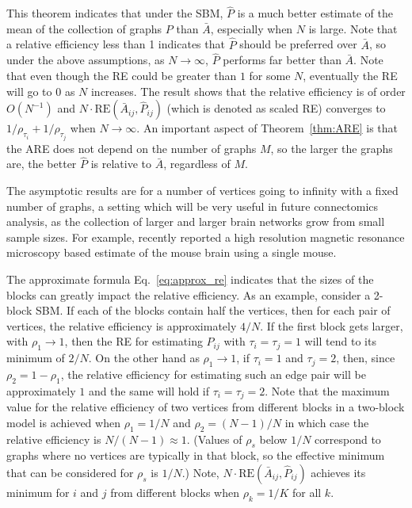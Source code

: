 \documentclass[journal,twoside,web]{ieeecolor}
\begin{document}
This theorem indicates that under the SBM, $\hat{P}$ is a much better estimate of the mean of the collection of graphs $P$ than $\bar{A}$, especially when $N$ is large.
Note that a relative efficiency less than 1 indicates that $\hat{P}$ should be preferred over $\bar{A}$, so under the above assumptions, as $N\to\infty$, $\hat{P}$ performs far better than $\bar{A}$.
Note that even though the RE could be greater than $1$ for some $N$, eventually the RE will go to 0 as $N$ increases.
The result shows that the relative efficiency is of order $O(N^{-1})$ and $N \cdot \mathrm{RE}(\bar{A}_{ij}, \hat{P}_{ij})$ (which is denoted as scaled RE) converges to $1/\rho_{\tau_i}+1/\rho_{\tau_j}$ when $N\to\infty$.
An important aspect of Theorem~\ref{thm:ARE} is that the ARE does not depend on the number of graphs $M$, so the larger the graphs are, the better $\hat{P}$ is relative to $\bar{A}$, regardless of $M$.

The asymptotic results are for a number of vertices going to infinity with a fixed number of graphs, a setting which will be very useful in future connectomics analysis, as the collection of larger and larger brain networks grow from small sample sizes.
For example, \cite{Calabrese2015} recently reported a high resolution magnetic resonance microscopy based estimate of the mouse brain using a single mouse.

The approximate formula Eq.~\ref{eq:approx_re} indicates that the sizes of the blocks can greatly impact the relative efficiency.
As an example, consider a 2-block SBM.
If each of the blocks contain half the vertices, then for each pair of vertices, the relative efficiency is approximately $4/N$.
If the first block gets larger, with $\rho_1\to 1$, then the RE for estimating $P_{ij}$ with $\tau_i=\tau_j=1$ will tend to its minimum of $2/N$.
On the other hand as $\rho_1\to 1$, if $\tau_i=1$ and $\tau_j=2$, then, since $\rho_2=1-\rho_1$, the relative efficiency for estimating such an edge pair will be approximately $1$ and the same will hold if $\tau_i=\tau_j=2$.
Note that the maximum value for the relative efficiency of two vertices from different blocks in a two-block model is achieved when $\rho_1=1/N$ and $\rho_2=(N-1)/N$ in which case the relative efficiency is $N/(N-1) \approx 1$.
(Values of $\rho_s$ below $1/N$ correspond to graphs where no vertices are typically in that block, so the effective minimum that can be considered for $\rho_s$ is $1/N$.)
Note, $N \cdot \mathrm{RE}(\bar{A}_{ij}, \hat{P}_{ij})$ achieves its minimum for $i$ and $j$ from different blocks when $\rho_k = 1/K$ for all $k$.
\end{document}
